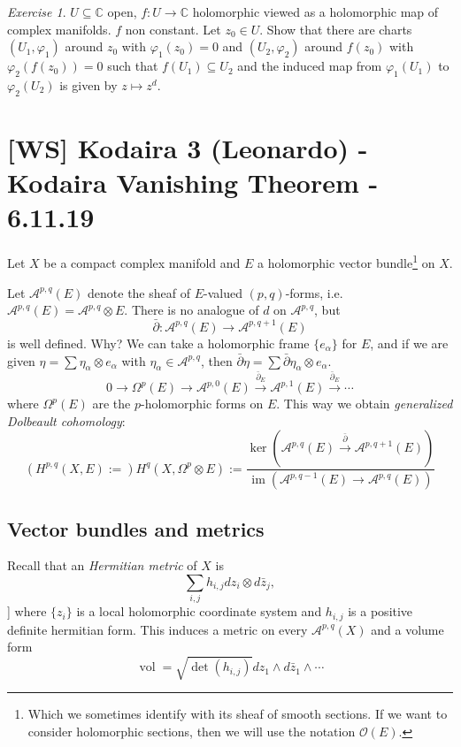 \documentclass[11pt,A4]{article}
\theoremstyle{plain}
\theoremstyle{definition}
\theoremstyle{remark}
\newtheorem{exe}[thm]{Exercise}
\newcommand{\1}{\mathbbm{1}}
\newcommand{\C}{\mathbb{C}}
\newcommand{\A}{\mathscr{A}}
\renewcommand{\O}{\mathcal{O}}
\DeclareMathOperator{\im}{im}
\DeclareMathOperator{\vol}{vol}
\newcommand{\ot}{\otimes}
\newcommand{\sub}{\subseteq}
\begin{document}
\begin{exe}
    $U\sub\C$ open, $f\colon U\to \C$ holomorphic viewed as a holomorphic map of complex manifolds.
    $f$ non constant.
    Let $z_{0}\in U$.
    Show that there are charts $(U_{1},\varphi_{1})$ around $z_{0}$ with $\varphi_{1}(z_{0})=0$ and $(U_{2},\varphi_{2})$ around $f(z_{0})$ with $\varphi_{2}(f(z_{0}))=0$ such that $f(U_{1})\sub U_{2}$ and the induced map from $\varphi_{1}(U_{1})$ to $\varphi_{2}(U_{2})$ is given by $z\mapsto z^{d}$.
\end{exe}

\section{[WS] Kodaira 3 (Leonardo) - Kodaira Vanishing Theorem - 6.11.19}

Let $X$ be a compact complex manifold and $E$ a holomorphic vector bundle\footnote{Which we sometimes identify with its sheaf of smooth sections. If we want to consider holomorphic sections, then we will use the notation $\O(E)$.} on $X$.

Let $\A^{p,q}(E)$ denote the sheaf of $E$-valued $(p,q)$-forms, i.e. $\A^{p,q}(E)=\A^{p,q}\ot E$.
There is no analogue of $d$ on $\A^{p,q}$, but
\[ \bar{\partial }\colon \A^{p,q}(E)\to \A^{p,q+1}(E) \]
is well defined.
Why?
We can take a holomorphic frame $\{ e_{\alpha}\}$ for $E$, and if we are given $\eta=\sum \eta_{\alpha}\ot e_{\alpha}$ with $\eta_{\alpha}\in \A^{p,q}$, then $\bar{\partial }\eta=\sum\bar{\partial}\eta_{\alpha}\ot e_{\alpha}$.
\[ 0\to \Omega^{p}(E)\to \A^{p,0}(E)\xrightarrow{\bar{\partial}_{E}} \A^{p,1}(E)\xrightarrow{\bar{\partial}_{E}}\cdots \]
where $\Omega^{p}(E)$ are the $p$-holomorphic forms on $E$.
This way we obtain \textit{generalized Dolbeault cohomology}:
\[ (H^{p,q}(X,E):=)H^{q}(X,\Omega^{p}\ot E):=\frac{\ker(\A^{p,q}(E)\xrightarrow{\bar{\partial}}\A^{p,q+1}(E))}{\im(\A^{p,q-1}(E)\to \A^{p,q}(E))} \]

\subsection{Vector bundles and metrics}

Recall that an \textit{Hermitian metric} of $X$ is
\[ \sum_{i,j}h_{i,j}dz_{i}\ot d\bar{z}_{j},\]]
where $\{z_{i}\}$ is a local holomorphic coordinate system and $h_{i,j}$ is a positive definite hermitian form.
This induces a metric on every $\A^{p,q}(X)$ and a volume form
\[ \vol=\sqrt{\det(h_{i,j})}dz_{1}\wedge d\bar{z}_{1}\wedge \cdots \]
\end{document}
